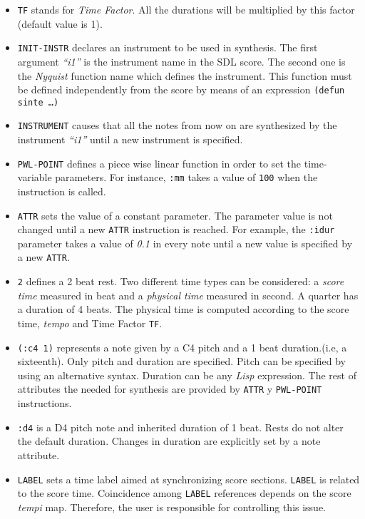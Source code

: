 \begin{itemize}
\item \texttt{TF} stands for \textit{Time Factor}. All the durations will
  be multiplied by this factor (default value is 1).
\item \texttt{INIT-INSTR} declares an instrument to be used in
  synthesis. The first argument \textit{``i1''} is the instrument name in
  the SDL score. The second one is the {\it Nyquist} function name
  which defines the instrument. This function must be defined independently from
   the score by means of an expression \mbox{\texttt{(defun sinte
      \ldots)}}



\item \texttt{INSTRUMENT} causes that all the notes from now on are
  synthesized by the instrument \textit{``i1''} until a new instrument
  is specified.

\item \texttt{PWL-POINT} defines a piece wise linear function in order
  to set the time-variable parameters. For instance, \texttt{:mm} takes
  a value of \texttt{100} when the instruction is called.


\item \texttt{ATTR} sets the value of a constant parameter. The
  parameter value is not changed until a new \texttt{ATTR} instruction
  is reached. For example, the \texttt{:idur} parameter takes a
  value of {\it 0.1} in every note until a new value is specified by a
  new \texttt{ATTR}.


\item \texttt{2} defines a 2 beat rest. Two different time types can
  be considered: a {\it score time} measured in beat and a {\it physical
    time} measured in second. A quarter has a duration of 4 beats.
  The physical time is computed according to the score time, {\it tempo} and Time Factor {\tt TF}.

\item \texttt{(:c4 1)} represents a note given by a C4 pitch and a 1
  beat duration.(i.e, a sixteenth). Only pitch and duration are
  specified. Pitch can be specified by using an alternative syntax.
  Duration can be any {\it Lisp } expression. The rest of attributes the
  needed for synthesis are provided by \texttt{ATTR} y
  \texttt{PWL-POINT} instructions.


\item \texttt{:d4} is a D4 pitch note and inherited duration of 1
  beat. Rests do not alter the default duration. Changes in duration 
  are explicitly set by a note attribute.

\item \texttt{LABEL} sets a time label aimed at synchronizing score
  sections. {\tt LABEL} is related to the score time. Coincidence among
  {\tt LABEL} references depends on the score {\it tempi} map.
  Therefore, the user is responsible for controlling this issue. 

\end{itemize}                  


